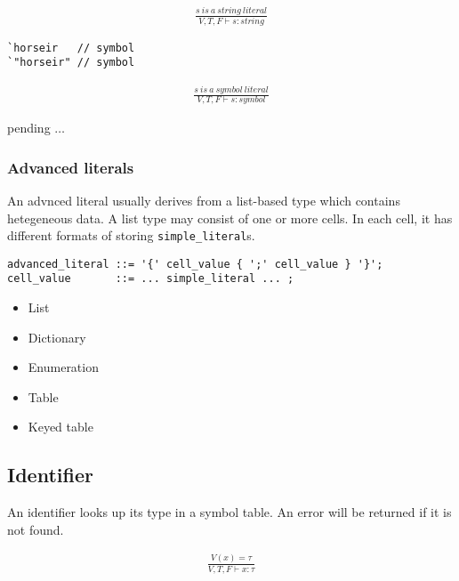 \begin{align*}
\frac{s\ is\ a\ string\ literal}{V,T,F\vdash s:string}
\end{align*}


\begin{verbatim}
`horseir   // symbol
`"horseir" // symbol
\end{verbatim}

\begin{align*}
\frac{s\ is\ a\ symbol\ literal}{V,T,F\vdash s:symbol}
\end{align*}


pending $\ldots$

\subsubsection{Advanced literals}

An advnced literal usually derives from a list-based type which contains hetegeneous data.  A list type may consist of one or more cells.  In each cell, it has different formats of storing \texttt{simple\_literal}s.

\begin{verbatim}
advanced_literal ::= '{' cell_value { ';' cell_value } '}';
cell_value       ::= ... simple_literal ... ;
\end{verbatim}


\begin{itemize}[noitemsep]
\item List
\item Dictionary
\item Enumeration
\item Table
\item Keyed table
\end{itemize}


\subsection{Identifier}

An identifier looks up its type in a symbol table.  An error will be returned if it is not found.

\begin{align*}
\frac{V(x)=\tau}{V,T,F\vdash x:\tau}
\end{align*}

